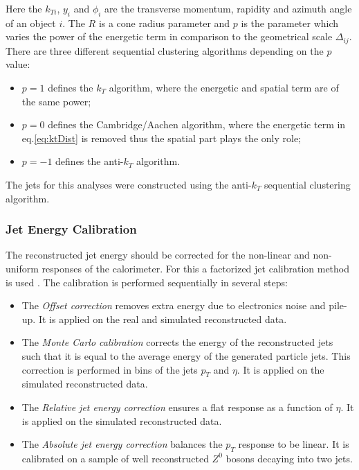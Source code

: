 Here the $k_{Ti}$, $y_{i}$ and $\phi_i$ are the transverse momentum, rapidity and azimuth angle of an object $i$. The $R$ is a cone radius parameter and 
$p$ is the parameter which varies the power of the energetic term in comparison to the geometrical scale $\Delta_{ij}$.
There are three different sequential clustering algorithms depending on the $p$ value:

\begin{itemize}
 \item $p = 1$ defines the $k_{T}$ algorithm, where the energetic and spatial term are of the same power;
 \item $p = 0$ defines the Cambridge/Aachen algorithm, where the energetic term in eq.\ref{eq:ktDist} is removed thus the spatial part plays the only role;
 \item $p = -1$ defines the anti-$k_{T}$ algorithm.
\end{itemize}

The jets for this analyses were constructed using the anti-$k_{T}$ sequential clustering algorithm. 

\subsubsection{Jet Energy Calibration}\label{ssec:JCal}

The reconstructed jet energy should be corrected for the non-linear and non-uniform responses of the calorimeter. For this a factorized jet calibration
method is used \cite{2011JInst...611002C}. The calibration is performed sequentially in several steps:

\begin{itemize}
 \item The \textit{Offset correction} removes extra energy due to electronics noise and pile-up. It is applied on the real and simulated reconstructed data.
 \item The \textit{Monte Carlo calibration} corrects the energy of the reconstructed jets such that it is equal to the average energy of the generated 
 particle jets. This correction is performed in bins of the jets $p_{T}$ and $\eta$. It is applied on the simulated reconstructed data.
 \item The \textit{Relative jet energy correction} ensures a flat response as a function of $\eta$. It is applied on the simulated reconstructed data.
 \item The \textit{Absolute jet energy correction} balances the $p_{T}$ response to be linear. It is calibrated on a sample of well reconstructed $Z^{0}$ bosons 
 decaying into two jets.
\end{itemize}


